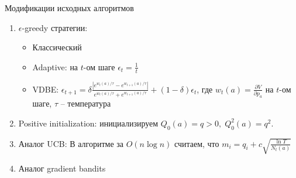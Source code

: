 \documentclass[11pt]{beamer} %
\begin{document}
    \begin{frame}{Модификации исходных алгоритмов}
        \begin{enumerate}
            \item<1-> $\epsilon$-greedy стратегии:
            \begin{itemize}
                \item Классический
                \item Adaptive: на $t$-ом шаге $\epsilon_t = \frac{1}{t}$ 
                \item VDBE: 
                $
                \epsilon_{t+1} = \delta  \frac{\left| e^{w_t(a)/\tau} - e^{w_{t+1}(a)/\tau} \right|}{e^{w_t(a)/\tau} + e^{w_{t+1}(a)/\tau}}  + (1 - \delta) \epsilon_t
                $, где $w_t(a) = \frac{\partial V}{\partial p_a}$ на $t$-ом шаге, $\tau$ -- температура
            \end{itemize}
            \item<2-> Positive initialization: инициализируем $Q_0(a) = q > 0, \; Q^2_0(a) = q^2$.
            \item<3-> Аналог UCB: В алгоритме за $O(n \log n)$ считаем, что $m_i = q_i + c \sqrt{\frac{\ln T}{N_t(a)}}$
            \item<4-> Аналог gradient bandits
        \end{enumerate}
    \end{frame}
    
\end{document}
